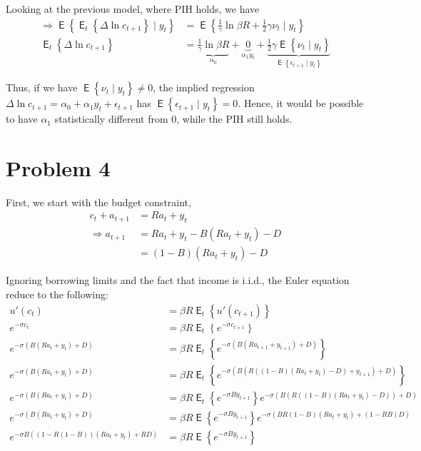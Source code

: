 \documentclass[12pt]{article}
\newcommand{\1}{{\bf 1}} %
\DeclareMathOperator{\E}{\mathsf{E}} %
\newcommand{\Ex}[1]{\E\left\{#1\right\}} %
\newcommand{\cbra}[1]{\left\{ #1 \right\}}
\begin{document}
\begin{enumerate}[(1)]
	Looking at the previous model, where PIH holds, we have
		\begin{align*}
	\Rightarrow \Ex{\E_t\cbra{\Delta \ln{c_{t+1}}}\mid y_t} &=  \Ex{\frac{1}{\gamma}\ln {\beta R } + \frac{1}{2}\gamma\nu_t\mid y_t} \\
	\E_t\cbra{\Delta \ln{c_{t+1}}} &=\underbrace{ \frac{1}{\gamma}\ln {\beta R }}_{\alpha_0} +\underbrace{ 0}_{\alpha_1y_t} + \underbrace{\frac{1}{2}\gamma \Ex{\nu_t\mid y_t}}_{\Ex{\epsilon_{t+1}\mid y_t}}
	\end{align*}
	
Thus, if we have $\Ex{\nu_t\mid y_t}\neq 0$, the implied regression $\Delta \ln{c_{t+1}} = \alpha_0+\alpha_1 y_t + \epsilon_{t+1}$ has $\Ex{\epsilon_{t+1}\mid y_t}=0$. Hence, it would be possible to have $\alpha_1$ statistically different from 0, while the PIH still holds.
	
\end{enumerate}
\section*{Problem 4}

First, we start with the budget constraint,
\begin{align*}
	c_t+a_{t+1} &= Ra_t+y_t\\
	\Rightarrow a_{t+1} &= Ra_t+y_t-B(Ra_t+y_t)-D\\
	&= (1-B)(Ra_t+y_t)-D
\end{align*}

Ignoring borrowing limits and the fact that income is i.i.d., the Euler equation reduce to the following:
\begin{align*}
	u'(c_t) & =\beta R \E_t \cbra{u'(c_{t+1})}\\
	e^{-\sigma c_t} & =\beta R \E_t \cbra{e^{-\sigma c_{t+1}}}\\
	e^{-\sigma (B(Ra_t+y_t)+D)} & =\beta R \E_t \cbra{e^{-\sigma (B(Ra_{t+1}+y_{t+1})+D)}}\\
	e^{-\sigma (B(Ra_t+y_t)+D)} & =\beta R \E_t \cbra{e^{-\sigma (B(R ((1-B)(Ra_t+y_t)-D)+y_{t+1})+D) }}\\
	e^{-\sigma (B(Ra_t+y_t)+D)} & =\beta R \E_t \cbra{e^{-\sigma B y_{t+1}}} e^{-\sigma (B(R ((1-B)(Ra_t+y_t)-D))+D) }\\
	e^{-\sigma (B(Ra_t+y_t)+D)} & =\beta R \Ex{e^{-\sigma B y_{t+1}}} e^{-\sigma (BR (1-B)(Ra_t+y_t)+(1-RB)D) }\\
	e^{-\sigma B((1-R(1-B))(Ra_t+y_t)+RD)} & =\beta R \Ex{e^{-\sigma B y_{t+1}}}
\end{align*}
\end{document}
